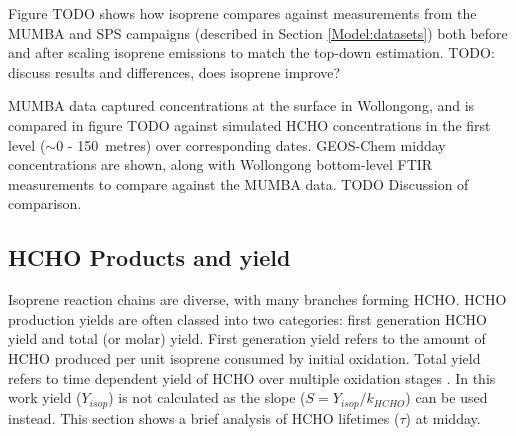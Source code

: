     
    
    Figure TODO shows how isoprene compares against measurements from the MUMBA and SPS campaigns (described in Section \ref{Model:datasets}) both before and after scaling isoprene emissions to match the top-down estimation.
    TODO: discuss results and differences, does isoprene improve?
    
    
    MUMBA data captured concentrations at the surface in Wollongong, and is compared in figure TODO against simulated HCHO concentrations in the first level ($\sim$0 - 150~metres) over corresponding dates.
    GEOS-Chem midday concentrations are shown, along with Wollongong bottom-level FTIR measurements to compare against the MUMBA data.
    TODO Discussion of comparison.
    
  \subsection{HCHO Products and yield}
    \label{BioIsop:results:HCHOYield}
    
    Isoprene reaction chains are diverse, with many branches forming HCHO. 
    HCHO production yields are often classed into two categories: first generation HCHO yield and total (or molar) yield.
    First generation yield refers to the amount of HCHO produced per unit isoprene consumed by initial oxidation.
    Total yield refers to time dependent yield of HCHO over multiple oxidation stages \parencite{Wolfe2016}.
    In this work yield ($Y_{isop}$) is not calculated as the slope ($S = Y_{isop}/k_{HCHO}$) can be used instead.
    This section shows a brief analysis of HCHO lifetimes ($\tau$) at midday.
    
